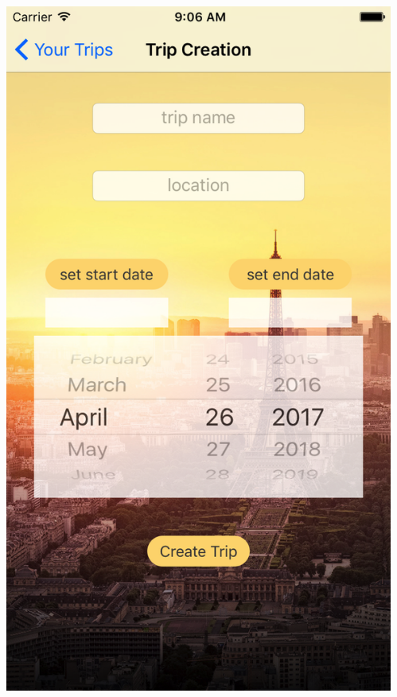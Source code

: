 \documentclass{beamer}
\begin{document}
\begin{frame}
\begin{columns}
\begin{column}{0.3\textwidth}
\begin{center}
        \end{center}
    \end{column}
    \begin{column}{0.3\textwidth}  %
        \begin{center}
            \includegraphics[scale=0.14]{tripsCreation}
        \end{center}
    \end{column}
\end{columns}
\end{frame}
\end{document}
